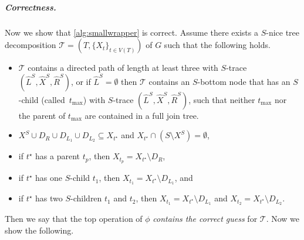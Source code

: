 \documentclass[a4paper,UKenglish,cleveref, autoref, thm-restate, numberwithinsect]{lipics-v2021}
\newcommand{\slim}{\text{slim}\xspace}
\begin{document}
\subparagraph{Correctness.}
Now we show that \cref{alg:smallwrapper} is correct. 
Assume there exists a \slim $S$-nice tree decomposition $\mathcal{T}=(T,\{X_t\}_{t\in V(T)})$ of $G$ such that the following holds.
\begin{itemize}
    \item $\mathcal{T}$ contains a directed path of length at least three with $S$-trace $(\hat{L}^S, \hat{X}^S, \hat{R}^S)$, or if $\hat{L}^S=\emptyset$ then $\mathcal{T}$ contains an $S$-bottom node that has an $S$-child (called~$t_{\max}$) with $S$-trace $(\hat{L}^S, \hat{X}^S, \hat{R}^S)$, such that neither $t_{\max}$ nor the parent of $t_{\max}$ are contained in a full join tree.
    \item $X^S\cup D_R\cup D_{L_1}\cup D_{L_2}\subseteq X_{t^\star}$ and $X_{t^\star}\cap (S\setminus X^S)=\emptyset$, 
    \item if $t^\star$ has a parent $t_p$, then $X_{t_p}=X_{t^\star}\setminus D_R$, 
    \item if $t^\star$ has one $S$-child $t_1$, then $X_{t_1}=X_{t^\star}\setminus D_{L_1}$, and 
    \item if $t^\star$ has two $S$-children $t_1$ and $t_2$, then $X_{t_1}=X_{t^\star}\setminus D_{L_1}$ and $X_{t_2}=X_{t^\star}\setminus D_{L_2}$.
\end{itemize} 
Then we say that the top operation of $\phi$ \emph{contains the correct guess} for $\mathcal{T}$.
Now we show the following. 
\end{document}
